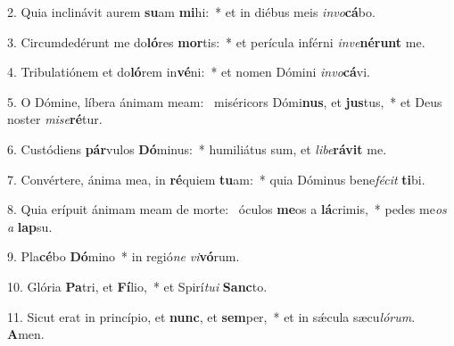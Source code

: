 2. Quia inclinávit aurem \textbf{su}am \textbf{mi}hi:~*  et in diébus meis \textit{in}\textit{vo}\textbf{cá}bo.\

3. Circumdedérunt me do\textbf{ló}res \textbf{mor}tis:~*  et perícula inférni \textit{in}\textit{ve}\textbf{né}\textbf{runt} me.\

4. Tribulatiónem et do\textbf{ló}rem in\textbf{vé}ni:~*  et nomen Dómini \textit{in}\textit{vo}\textbf{cá}vi.\

5. O Dómine, líbera ánimam meam: \dag\  miséricors Dómi\textbf{nus}, et \textbf{jus}tus,~*  et Deus noster \textit{mi}\textit{se}\textbf{ré}tur.\

6. Custódiens \textbf{pár}vulos \textbf{Dó}minus:~*  humiliátus sum, et \textit{li}\textit{be}\textbf{rá}\textbf{vit} me.\

7. Convértere, ánima mea, in \textbf{ré}quiem \textbf{tu}am:~*  quia Dóminus bene\textit{fé}\textit{cit} \textbf{ti}bi.\

8. Quia erípuit ánimam meam de morte: \dag\  óculos \textbf{me}os a \textbf{lá}crimis,~*  pedes me\textit{os} \textit{a} \textbf{lap}su.\

9. Pla\textbf{cé}bo \textbf{Dó}mino~*  in regió\textit{ne} \textit{vi}\textbf{vó}rum.\

10. Glória \textbf{Pa}tri, et \textbf{Fí}lio,~*  et Spirí\textit{tu}\textit{i} \textbf{Sanc}to.\

11. Sicut erat in princípio, et \textbf{nunc}, et \textbf{sem}per,~*  et in sǽcula sæcu\textit{ló}\textit{rum}. \textbf{A}men.\

